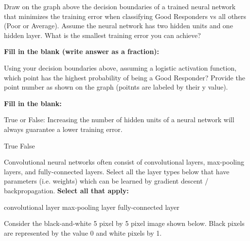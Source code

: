 \documentclass[11pt,addpoints,answers]{exam}
\begin{document}
\begin{questions}
    \question[2] Draw on the graph above the decision boundaries of a trained neural network that minimizes the training error when classifying Good Responders vs all others (Poor or Average). Assume the neural network has two hidden units and one hidden layer. What is the smallest training error you can achieve?
    
        \textbf{Fill in the blank (write answer as a fraction):}
    
    \begin{your_solution}[height=2cm, width=4cm]
    \end{your_solution}
    
    \clearpage
    
    \question[2] Using your decision boundaries above, assuming a logistic activation function, which point has the highest probability of being a Good Responder? Provide the point number as shown on the graph (poitnts are labeled by their y value).
    
            \textbf{Fill in the blank:}
    
    \begin{your_solution}[height=2cm, width=4cm]
    \end{your_solution}
    
    
    \question[1] True or False: Increasing the number of hidden units of a neural network will always guarantee a lower training error. 
    
    \begin{checkboxes}
        \choice True
        \choice False
    \end{checkboxes}
    
    



    \question[1] Convolutional neural networks often consist of convolutional layers, max-pooling layers, and fully-connected layers. Select all the layer types below that have parameters (i.e. weights) which can be learned by gradient descent / backpropagation. \textbf{Select all that apply:}
    {
    \checkboxchar{$\Box$} \checkedchar{$\blacksquare$}
        \begin{checkboxes}
            \choice convolutional layer
            \choice max-pooling layer
            \choice fully-connected layer
        \end{checkboxes}
    }
    
    \question[2] Consider the black-and-white 5 pixel by 5 pixel image shown below. Black pixels are represented by the value 0 and white pixels by 1.
    

\end{questions}
\end{document}
